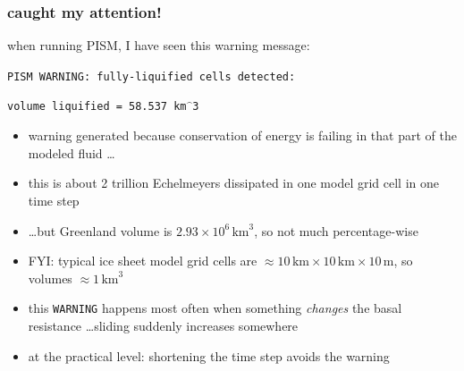\documentclass{beamer}
\begin{document}
\begin{frame}
  \frametitle{caught my attention!}

when running PISM, I have seen this warning message:
\begin{center}
\scriptsize \texttt{PISM WARNING: fully-liquified cells detected:}

\qquad \texttt{volume liquified = 58.537 km$\hat{\phantom{o}}$3}
\end{center}

\begin{itemize}
\item warning generated because conservation of energy is failing in that part of the modeled fluid \dots
\item this is about 2 trillion Echelmeyers dissipated in one model grid cell in one time step
\item \dots but Greenland volume is $2.93 \times 10^6\,\text{km}^3$, so not much percentage-wise
\item FYI:  typical ice sheet model grid cells are $\approx 10\,\text{km}\times 10\,\text{km} \times 10\,\text{m}$, so volumes $\approx 1\,\text{km}^3$
\item this \texttt{WARNING} happens most often when something \emph{changes} the basal resistance \dots sliding suddenly increases somewhere
\item at the practical level: shortening the time step avoids the warning
\end{itemize}
\end{frame}
\end{document}
